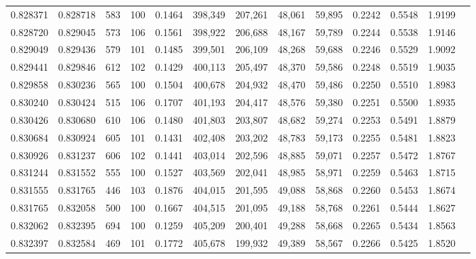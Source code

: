 \begin{tabular}{rrrrrrrrrrrrr}
0.828371 & 0.828718 &   583 & 100 &                                     0.1464 & 398,349 & 207,261 &  48,061 &  59,895 & 0.2242 & 0.5548 & 1.9199 \\
0.828720 & 0.829045 &   573 & 106 &                                     0.1561 & 398,922 & 206,688 &  48,167 &  59,789 & 0.2244 & 0.5538 & 1.9146 \\
0.829049 & 0.829436 &   579 & 101 &                                     0.1485 & 399,501 & 206,109 &  48,268 &  59,688 & 0.2246 & 0.5529 & 1.9092 \\
0.829441 & 0.829846 &   612 & 102 &                                     0.1429 & 400,113 & 205,497 &  48,370 &  59,586 & 0.2248 & 0.5519 & 1.9035 \\
0.829858 & 0.830236 &   565 & 100 &                                     0.1504 & 400,678 & 204,932 &  48,470 &  59,486 & 0.2250 & 0.5510 & 1.8983 \\
0.830240 & 0.830424 &   515 & 106 &                                     0.1707 & 401,193 & 204,417 &  48,576 &  59,380 & 0.2251 & 0.5500 & 1.8935 \\
0.830426 & 0.830680 &   610 & 106 &                                     0.1480 & 401,803 & 203,807 &  48,682 &  59,274 & 0.2253 & 0.5491 & 1.8879 \\
0.830684 & 0.830924 &   605 & 101 &                                     0.1431 & 402,408 & 203,202 &  48,783 &  59,173 & 0.2255 & 0.5481 & 1.8823 \\
0.830926 & 0.831237 &   606 & 102 &                                     0.1441 & 403,014 & 202,596 &  48,885 &  59,071 & 0.2257 & 0.5472 & 1.8767 \\
0.831244 & 0.831552 &   555 & 100 &                                     0.1527 & 403,569 & 202,041 &  48,985 &  58,971 & 0.2259 & 0.5463 & 1.8715 \\
0.831555 & 0.831765 &   446 & 103 &                                     0.1876 & 404,015 & 201,595 &  49,088 &  58,868 & 0.2260 & 0.5453 & 1.8674 \\
0.831765 & 0.832058 &   500 & 100 &                                     0.1667 & 404,515 & 201,095 &  49,188 &  58,768 & 0.2261 & 0.5444 & 1.8627 \\
0.832062 & 0.832395 &   694 & 100 &                                     0.1259 & 405,209 & 200,401 &  49,288 &  58,668 & 0.2265 & 0.5434 & 1.8563 \\
0.832397 & 0.832584 &   469 & 101 &                                     0.1772 & 405,678 & 199,932 &  49,389 &  58,567 & 0.2266 & 0.5425 & 1.8520 \\

\end{tabular}
